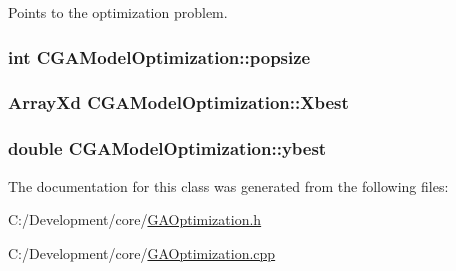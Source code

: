 Points to the optimization problem. 

\hypertarget{class_c_g_a_model_optimization_a630bb8f0d92f88da6923cabbe2dc6bbd}{
\subsubsection[{popsize}]{\setlength{\rightskip}{0pt plus 5cm}int C\-G\-A\-Model\-Optimization\-::popsize\hspace{0.3cm}{\ttfamily [protected]}}}\label{class_c_g_a_model_optimization_a630bb8f0d92f88da6923cabbe2dc6bbd}
\hypertarget{class_c_g_a_model_optimization_a20e94024ae32a632442dfb9de308c81e}{
\subsubsection[{Xbest}]{\setlength{\rightskip}{0pt plus 5cm}Array\-Xd C\-G\-A\-Model\-Optimization\-::\-Xbest\hspace{0.3cm}{\ttfamily [protected]}}}\label{class_c_g_a_model_optimization_a20e94024ae32a632442dfb9de308c81e}
\hypertarget{class_c_g_a_model_optimization_aa29eb539bc5208c83e5507942e45de91}{
\subsubsection[{ybest}]{\setlength{\rightskip}{0pt plus 5cm}double C\-G\-A\-Model\-Optimization\-::ybest\hspace{0.3cm}{\ttfamily [protected]}}}\label{class_c_g_a_model_optimization_aa29eb539bc5208c83e5507942e45de91}


The documentation for this class was generated from the following files\-:\begin{DoxyCompactItemize}
\item 
C\-:/\-Development/core/\hyperlink{_g_a_optimization_8h}{G\-A\-Optimization.\-h}\item 
C\-:/\-Development/core/\hyperlink{_g_a_optimization_8cpp}{G\-A\-Optimization.\-cpp}\end{DoxyCompactItemize}
